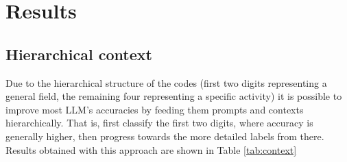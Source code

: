 \documentclass[fleqn,moreauthors,10pt]{ds_report}
\begin{document}
\section*{Results}


\begin{table}[!htb]
\centering
{}
\caption{Performance comparison on test set with manually annotated ground truths. Classification accuracies are divided by the number of correctly classified digits.}
\label{tab:layers}
\end{table}


\subsection*{Hierarchical context}

Due to the hierarchical structure of the codes (first two digits representing a general field, the remaining four representing a specific activity) it is possible to improve most LLM's accuracies by feeding them prompts and contexts hierarchically. That is, first classify the first two digits, where accuracy is generally higher, then progress towards the more detailed labels from there. Results obtained with this approach are shown in Table \ref{tab:context}

\begin{table}[!htb]
\centering
{}
\caption{Performance comparison with and without hierarchical context.}
\label{tab:context}
\end{table}
\end{document}
